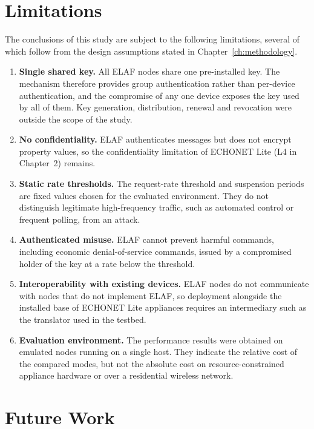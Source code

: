 \section{Limitations}
\label{sec:c-limits}

The conclusions of this study are subject to the following limitations, several of which follow from the design assumptions stated in Chapter~\ref{ch:methodology}.

\begin{enumerate}
  \item \textbf{Single shared key.} All ELAF nodes share one pre-installed key. The mechanism therefore provides group authentication rather than per-device authentication, and the compromise of any one device exposes the key used by all of them. Key generation, distribution, renewal and revocation were outside the scope of the study.
  \item \textbf{No confidentiality.} ELAF authenticates messages but does not encrypt property values, so the confidentiality limitation of ECHONET Lite (L4 in Chapter~2) remains.
  \item \textbf{Static rate thresholds.} The request-rate threshold and suspension periods are fixed values chosen for the evaluated environment. They do not distinguish legitimate high-frequency traffic, such as automated control or frequent polling, from an attack.
  \item \textbf{Authenticated misuse.} ELAF cannot prevent harmful commands, including economic denial-of-service commands, issued by a compromised holder of the key at a rate below the threshold.
  \item \textbf{Interoperability with existing devices.} ELAF nodes do not communicate with nodes that do not implement ELAF, so deployment alongside the installed base of ECHONET Lite appliances requires an intermediary such as the translator used in the testbed.
  \item \textbf{Evaluation environment.} The performance results were obtained on emulated nodes running on a single host. They indicate the relative cost of the compared modes, but not the absolute cost on resource-constrained appliance hardware or over a residential wireless network.
\end{enumerate}

\section{Future Work}
\label{sec:c-future}

